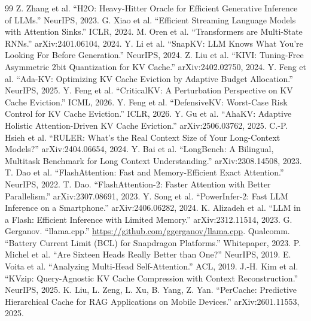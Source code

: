 \documentclass[sigconf, anonymous=false, screen=true]{acmart}
\begin{document}
\begin{thebibliography}{99}
\small
{} Z. Zhang et al. ``H2O: Heavy-Hitter Oracle for Efficient Generative Inference of LLMs.'' NeurIPS, 2023.
 G. Xiao et al. ``Efficient Streaming Language Models with Attention Sinks.'' ICLR, 2024.
 M. Oren et al. ``Transformers are Multi-State RNNs.'' arXiv:2401.06104, 2024.
 Y. Li et al. ``SnapKV: LLM Knows What You're Looking For Before Generation.'' NeurIPS, 2024.
 Z. Liu et al. ``KIVI: Tuning-Free Asymmetric 2bit Quantization for KV Cache.'' arXiv:2402.02750, 2024.
 Y. Feng et al. ``Ada-KV: Optimizing KV Cache Eviction by Adaptive Budget Allocation.'' NeurIPS, 2025.
 Y. Feng et al. ``CriticalKV: A Perturbation Perspective on KV Cache Eviction.'' ICML, 2026.
 Y. Feng et al. ``DefensiveKV: Worst-Case Risk Control for KV Cache Eviction.'' ICLR, 2026.
 Y. Gu et al. ``AhaKV: Adaptive Holistic Attention-Driven KV Cache Eviction.'' arXiv:2506.03762, 2025.
 C.-P. Hsieh et al. ``RULER: What's the Real Context Size of Your Long-Context Models?'' arXiv:2404.06654, 2024.
 Y. Bai et al. ``LongBench: A Bilingual, Multitask Benchmark for Long Context Understanding.'' arXiv:2308.14508, 2023.
 T. Dao et al. ``FlashAttention: Fast and Memory-Efficient Exact Attention.'' NeurIPS, 2022.
 T. Dao. ``FlashAttention-2: Faster Attention with Better Parallelism.'' arXiv:2307.08691, 2023.
 Y. Song et al. ``PowerInfer-2: Fast LLM Inference on a Smartphone.'' arXiv:2406.06282, 2024.
 K. Alizadeh et al. ``LLM in a Flash: Efficient Inference with Limited Memory.'' arXiv:2312.11514, 2023.
 G. Gerganov. ``llama.cpp.'' \url{https://github.com/ggerganov/llama.cpp}.
 Qualcomm. ``Battery Current Limit (BCL) for Snapdragon Platforms.'' Whitepaper, 2023.
 P. Michel et al. ``Are Sixteen Heads Really Better than One?'' NeurIPS, 2019.
 E. Voita et al. ``Analyzing Multi-Head Self-Attention.'' ACL, 2019.
 J.-H. Kim et al. ``KVzip: Query-Agnostic KV Cache Compression with Context Reconstruction.'' NeurIPS, 2025.
 K. Liu, L. Zeng, L. Xu, B. Yang, Z. Yan. ``PerCache: Predictive Hierarchical Cache for RAG Applications on Mobile Devices.'' arXiv:2601.11553, 2025.

\end{thebibliography}
\end{document}
